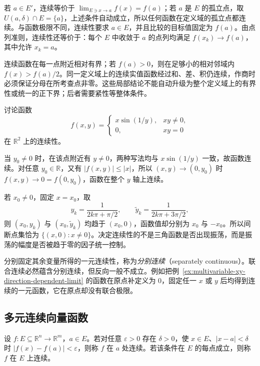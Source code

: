 若 $a\in E'$，连续等价于 $\lim_{E\ni x\to a}f(x)=f(a)$；若 $a$ 是 $E$ 的孤立点，取 $U(a,\delta)\cap E=\{a\}$，上述条件自动成立，所以任何函数在定义域的孤立点都连续。与函数极限不同，连续性要求 $a\in E$，并且比较的目标值固定为 $f(a)$。由点列准则，连续性还等价于：每个 $E$ 中收敛于 $a$ 的点列均满足 $f(x_k)\to f(a)$，其中允许 $x_k=a$。

连续函数在每一点附近相对有界；若 $f(a)>0$，则在足够小的相对邻域内 $f(x)>f(a)/2$。同一定义域上的连续实值函数经过和、差、积仍连续，作商时必须保证分母在所考查点非零。这些局部结论不能自动升级为整个定义域上的有界性或统一的正下界；后者需要紧性等整体条件。

\begin{example}
\label{ex:oscillatory-multivariable-continuity-set}
讨论函数
\[
    f(x,y)=\begin{cases}
        x\sin(1/y),&xy\neq0,\\
        0,&xy=0
    \end{cases}
\]
在 $\mathbb R^2$ 上的连续性。
\end{example}

\begin{solve}
当 $y_0\neq0$ 时，在该点附近有 $y\neq0$，两种写法均与 $x\sin(1/y)$ 一致，故函数连续。对任意 $y_0\in\mathbb R$，又有 $|f(x,y)|\leq|x|$，所以 $(x,y)\to(0,y_0)$ 时 $f(x,y)\to0=f(0,y_0)$，函数在整个 $y$ 轴上连续。

若 $x_0\neq0$，固定 $x=x_0$，取
\[
    y_k=\frac1{2k\pi+\pi/2},\qquad
    \widetilde y_k=\frac1{2k\pi+3\pi/2},
\]
则 $(x_0,y_k)$ 与 $(x_0,\widetilde y_k)$ 均趋于 $(x_0,0)$，函数值却分别为 $x_0$ 与 $-x_0$。所以间断点集恰为 $\{(x,0):x\neq0\}$。决定连续性的不是三角函数是否出现振荡，而是振荡的幅度是否被趋于零的因子统一控制。
\end{solve}

分别固定其余变量所得的一元连续性，称为\emph{分别连续}（separately continuous）。联合连续必然蕴含分别连续，但反向一般不成立。例如把例~\ref{ex:multivariable-xy-direction-dependent-limit} 的函数在原点补定义为 $0$，固定任一 $x$ 或 $y$ 后均得到连续的一元函数，它在原点却没有联合极限。

\subsection{多元连续向量函数}
\label{subsec:continuous-multivariable-vector-functions}

\begin{definition}
\label{def:relative-vector-function-continuity}
设 $f:E\subseteq\mathbb R^n\to\mathbb R^m$，$a\in E$。若对任意 $\varepsilon>0$ 存在 $\delta>0$，使 $x\in E$、$|x-a|<\delta$ 时 $|f(x)-f(a)|<\varepsilon$，则称 $f$ 在 $a$ 处连续。若该条件在 $E$ 的每点成立，则称 $f$ 在 $E$ 上连续。
\end{definition}

